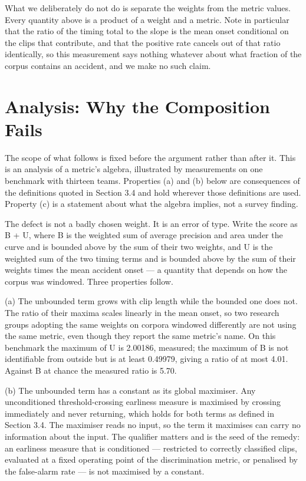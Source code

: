 What we deliberately do not do is separate the weights from the metric values. Every quantity above is a product of a weight and a metric. Note in particular that the ratio of the timing total to the slope is the mean onset conditional on the clips that contribute, and that the positive rate cancels out of that ratio identically, so this measurement says nothing whatever about what fraction of the corpus contains an accident, and we make no such claim.


\section{Analysis: Why the Composition Fails}

The scope of what follows is fixed before the argument rather than after it. This is an analysis of a metric's algebra, illustrated by measurements on one benchmark with thirteen teams. Properties (a) and (b) below are consequences of the definitions quoted in Section 3.4 and hold wherever those definitions are used. Property (c) is a statement about what the algebra implies, not a survey finding.

The defect is not a badly chosen weight. It is an error of type. Write the score as B + U, where B is the weighted sum of average precision and area under the curve and is bounded above by the sum of their two weights, and U is the weighted sum of the two timing terms and is bounded above by the sum of their weights times the mean accident onset --- a quantity that depends on how the corpus was windowed. Three properties follow.

(a) The unbounded term grows with clip length while the bounded one does not. The ratio of their maxima scales linearly in the mean onset, so two research groups adopting the same weights on corpora windowed differently are not using the same metric, even though they report the same metric's name. On this benchmark the maximum of U is 2.00186, measured; the maximum of B is not identifiable from outside but is at least 0.49979, giving a ratio of at most 4.01. Against B at chance the measured ratio is 5.70.

(b) The unbounded term has a constant as its global maximiser. Any unconditioned threshold-crossing earliness measure is maximised by crossing immediately and never returning, which holds for both terms as defined in Section 3.4. The maximiser reads no input, so the term it maximises can carry no information about the input. The qualifier matters and is the seed of the remedy: an earliness measure that is conditioned --- restricted to correctly classified clips, evaluated at a fixed operating point of the discrimination metric, or penalised by the false-alarm rate --- is not maximised by a constant.

